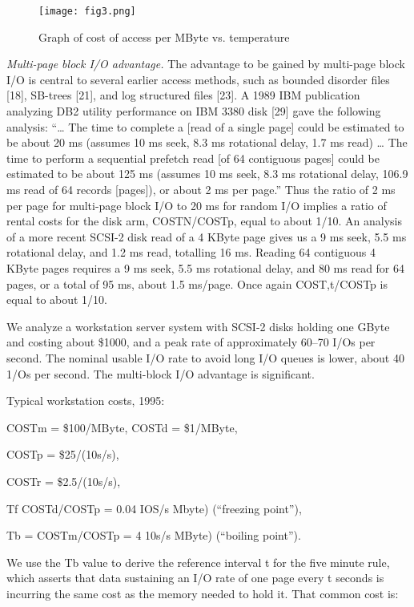 \documentclass[a4paper,12pt,notitlepage,twoside,openright]{article}
\begin{document}
\begin{figure}
  \centering
  \texttt{[image: fig3.png]}
  \caption{Graph of cost of access per MByte vs. temperature}
\end{figure}

\emph{Multi-page block I/O advantage.} The advantage to be gained by multi-page
block I/O is central to several earlier access methods, such as bounded
disorder files {[}18{]},
SB-trees {[}21{]}, and log structured files {[}23{]}. A 1989 IBM
publication analyzing DB2 utility performance on IBM 3380 disk {[}29{]}
gave the following analysis: ``\ldots
The time to complete a {[}read of a single page{]} could be estimated to
be about 20 ms (assumes 10 ms seek, 8.3 ms rotational delay, 1.7 ms
read) \ldots
The time to perform a sequential prefetch read {[}of 64
contiguous pages{]} could be estimated to be about 125 ms (assumes 10 ms
seek, 8.3 ms rotational delay, 106.9 ms read of 64 records {[}pages{]}),
or about 2 ms per page.'' Thus the ratio of 2 ms per page for multi-page
block I/O to 20 ms for random I/O implies a ratio of rental costs for
the disk arm, COSTN/COSTp, equal to about 1/10. An analysis of a more
recent SCSI-2 disk read of a 4 KByte page gives us a 9 ms seek, 5.5 ms
rotational delay, and 1.2 ms read, totalling 16 ms. Reading 64
contiguous 4 KByte pages requires a 9 ms seek, 5.5 ms rotational delay,
and 80 ms read for 64 pages, or a total of 95 ms, about 1.5 ms/page.
Once again COST,t/COSTp is equal to about 1/10.

We analyze a workstation server system with SCSI-2 disks holding one
GByte and costing about \$1000, and a peak rate of approximately
60--70 I/Os per second. The nominal usable I/O rate to avoid long I/O
queues is lower, about 40 1/Os per second. The multi-block I/O advantage
is significant.

Typical workstation costs, 1995:

COSTm = \$100/MByte, COSTd = \$1/MByte,

COSTp = \$25/(10s/s),

COSTr = \$2.5/(10s/s),

Tf COSTd/COSTp = 0.04 IOS/s Mbyte) (``freezing point''),

Tb = COSTm/COSTp = 4 10s/s MByte) (``boiling point'').

We use the Tb value to derive the reference interval t for the five
minute rule, which asserts that data sustaining an I/O rate of one page
every t seconds is incurring the same cost as the memory needed to hold
it. That common cost is:
\end{document}
